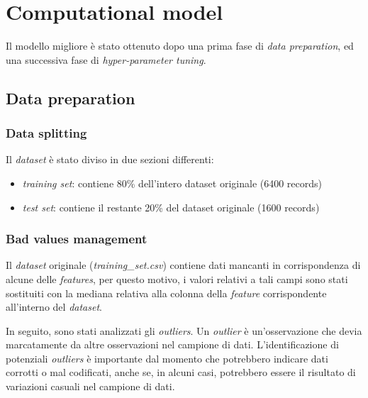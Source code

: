 \section{Computational model}

        Il modello migliore è stato ottenuto dopo una prima fase di \textit{data preparation}, ed una successiva fase di \textit{hyper-parameter tuning}.

        \subsection{Data preparation}
        
                \subsubsection{Data splitting}
                
                        Il \textit{dataset} è stato diviso in due sezioni differenti:
                        \begin{itemize}
                                \item \textit{training set}: contiene 80\% dell'intero dataset originale (6400 records)
                                \item \textit{test set}: contiene il restante 20\% del dataset originale (1600 records)
                        \end{itemize}
                
                \subsubsection{Bad values management}
                
                        Il \textit{dataset} originale (\textit{training\_set.csv}) contiene dati mancanti in corrispondenza di alcune delle \textit{features}, per questo motivo, i valori relativi a tali campi sono stati sostituiti con la mediana relativa alla colonna della \textit{feature} corrispondente all'interno del \textit{dataset}.
                        \bigbreak
                        
                        In seguito, sono stati analizzati gli \textit{outliers}. Un \textit{outlier} è un'osservazione che devia marcatamente da altre osservazioni nel campione di dati. L'identificazione di potenziali \textit{outliers} è importante dal momento che potrebbero indicare dati corrotti o mal codificati, anche se, in alcuni casi, potrebbero essere il risultato di variazioni casuali nel campione di dati.
                        
